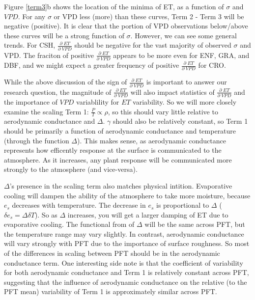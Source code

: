\documentclass[draft,linenumbers]{agujournal}
\begin{document}
Figure \ref{term3}b shows the location of the minima of ET, as a function of $\sigma$ and $VPD$. For any $\sigma$ or VPD less (more) than these curves, Term 2 - Term 3 will be negative (positive). It is clear that the portion of VPD observations below/above these curves will be a strong function of $\sigma$. However, we can see some general trends. For CSH, $\frac{\partial \; ET}{\partial \; VPD}$ should be negative for the vast majority of observed $\sigma$ and VPD. The fraciton of positive $\frac{\partial \; ET}{\partial \; VPD}$ appears to be more even for ENF, GRA, and DBF, and we might expect a greater frequency of positive $\frac{\partial \; ET}{\partial \; VPD}$ for CRO. 

While the above discussion of the sign of $\frac{\partial \; ET}{\partial \; VPD}$ is important to answer our research question, the magnitude of $\frac{\partial \; ET}{\partial \; VPD}$ will also impact statistics of $\frac{\partial \; ET}{\partial \; VPD}$ and the importance of $VPD$ variablility for $ET$ variability. So we will more closely examine the scaling Term 1: $\frac{P}{T} \propto \rho$, so this should vary little relative to aerodynamic conductance and $\Delta$. $\gamma$ should also be relatively constant, so Term 1 should be primarily a function of aerodynamic conductance and temperature (through the function $\Delta$). This makes sense, as aerodynamic conductance represents how efficently response at the surface is communicated to the atmosphere. As it increases, any plant response will be communicated more strongly to the atmosphere (and vice-versa).

$\Delta$'s presence in the scaling term also matches physical intition. Evaporative cooling will dampen the ability of the atmosphere to take more moisture, because $e_{s}$ decreases with temperature. The decrease in $e_{s}$ is proportional to $\Delta$ ($\delta e_{s} = \Delta \delta T$). So as $\Delta$ increases, you will get a larger damping of ET due to evaporative cooling.  The functional from of $\Delta$ will be the same across PFT, but the temperature range may vary slightly. In contrast, aerodynamic conductance will vary strongly with PFT due to the importance of surface roughness. So most of the differences in scaling between PFT should be in the aerodynamic conductance term. One interesting side note is that the coefficient of variability for both aerodynamic conductance and Term 1 is relatively constant across PFT, suggesting that the influence of aerodynamic conductance on the relative (to the PFT mean) variability of Term 1 is approximately similar across PFT.
\end{document}
